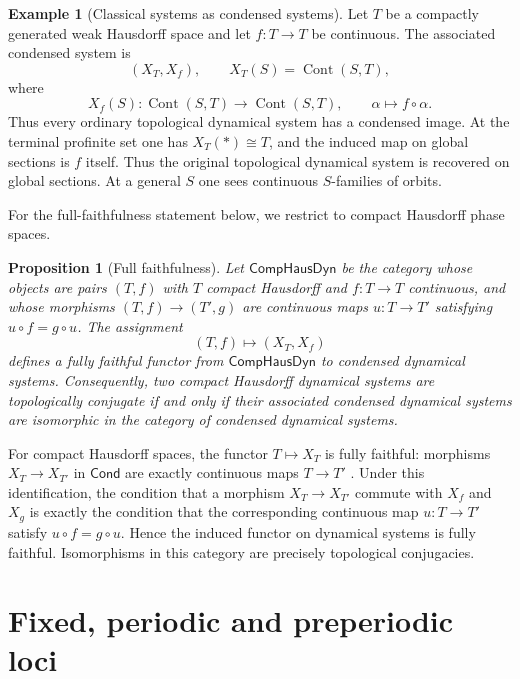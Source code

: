 \documentclass[10pt]{amsart}
\makeatletter
\newcommand{\Cond}{\mathsf{Cond}}
\newcommand{\Cont}{\operatorname{Cont}}
\theoremstyle{plain}
\newtheorem{proposition}[theorem]{Proposition}
\theoremstyle{definition}
\newtheorem{example}[theorem]{Example}
\renewenvironment{proof}[1][\proofname]{\par
  \pushQED{\qed}%
  \normalfont \topsep6\p@\@plus6\p@\relax
  \trivlist
  \item[\hskip\labelsep\itshape #1\@addpunct{:}]\ignorespaces
}{%
  \popQED\endtrivlist\@endpefalse
}
\makeatother
\begin{document}
\begin{example}[Classical systems as condensed systems]
Let $T$ be a compactly generated weak Hausdorff space and let $f:T\to T$ be
continuous. The associated condensed system is
\[
  (X_T,X_f),\qquad X_T(S)=\Cont(S,T),
\]
where
\[
  X_f(S):\Cont(S,T)\to\Cont(S,T),\qquad
  \alpha\mapsto f\circ\alpha.
\]
Thus every ordinary topological dynamical system has a condensed image. At the
terminal profinite set one has $X_T(*)\cong T$, and the induced map on global
sections is $f$ itself. Thus the original topological dynamical system is
recovered on global sections. At a general $S$ one sees continuous
$S$-families of orbits.
\end{example}

For the full-faithfulness statement below, we restrict to compact Hausdorff
phase spaces.

\begin{proposition}[Full faithfulness]
\label{prop:fully-faithful-dynamics}
Let $\mathsf{CompHausDyn}$ be the category whose objects are pairs $(T,f)$ with
$T$ compact Hausdorff and $f:T\to T$ continuous, and whose morphisms
$(T,f)\to(T',g)$ are continuous maps $u:T\to T'$ satisfying
$u\circ f=g\circ u$. The assignment
\[
  (T,f)\longmapsto (X_T,X_f)
\]
defines a fully faithful functor from $\mathsf{CompHausDyn}$ to condensed
dynamical systems. Consequently, two compact Hausdorff dynamical systems are
topologically conjugate if and only if their associated condensed dynamical
systems are isomorphic in the category of condensed dynamical systems.
\end{proposition}

\begin{proof}
For compact Hausdorff spaces, the functor $T\mapsto X_T$ is fully faithful:
morphisms $X_T\to X_{T'}$ in $\Cond$ are exactly continuous maps
$T\to T'$ \cite{ClausenScholze,LeStumCondensed}. Under this identification, the
condition that a morphism $X_T\to X_{T'}$ commute with $X_f$ and $X_g$ is exactly
the condition that the corresponding continuous map $u:T\to T'$ satisfy
$u\circ f=g\circ u$. Hence the induced functor on dynamical systems is fully
faithful. Isomorphisms in this category are precisely topological conjugacies.
\end{proof}

\section{Fixed, periodic and preperiodic loci}
\label{sec:periodic}
\end{document}
